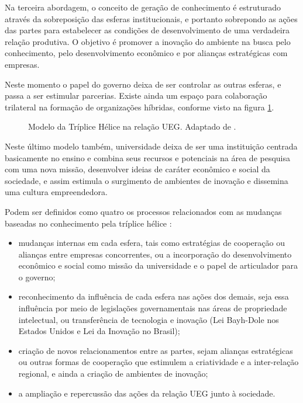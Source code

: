 Na terceira abordagem, o conceito de geração de conhecimento é estruturado através da sobreposição das esferas institucionais, e portanto sobrepondo as ações das partes para estabelecer as condições de desenvolvimento de uma verdadeira relação produtiva. O objetivo é promover a inovação do ambiente na busca pelo conhecimento, pelo desenvolvimento econômico e por alianças estratégicas com empresas.

Neste momento o papel do governo deixa de ser controlar as outras esferas, e passa a ser estimular parcerias. Existe ainda um espaço para colaboração trilateral na formação de organizações híbridas, conforme visto na figura \ref{triplice_helice}.


\begin{figure}[ht]
  \centering
  \caption{Modelo da Tríplice Hélice na relação UEG. Adaptado de \cite{etzkowitz2003innovation}.}
  \label{triplice_helice}
\end{figure}

Neste último modelo também, universidade deixa de ser uma instituição centrada basicamente no ensino e combina seus recursos e potenciais na área de pesquisa com uma nova missão, desenvolver ideias de caráter econômico e social da sociedade, e assim estimula o surgimento de ambientes de inovação e dissemina uma cultura empreendedora.

Podem ser definidos como quatro os processos relacionados com as mudanças baseadas no conhecimento pela tríplice hélice \cite{etzkowitz2003innovation}:

\begin{itemize}
  \item{mudanças internas em cada esfera, tais como estratégias de cooperação ou alianças entre empresas concorrentes, ou a incorporação do desenvolvimento econômico e social como missão da universidade e o papel de articulador para o governo;}
  \item{reconhecimento da influência de cada esfera nas ações dos demais, seja essa influência por meio de legislações governamentais nas áreas de propriedade intelectual, ou transferência de tecnologia e inovação (Lei Bayh-Dole nos Estados Unidos e Lei da Inovação no Brasil);}
  \item{criação de novos relacionamentos entre as partes, sejam alianças estratégicas ou outras formas de cooperação que estimulem a criatividade e a inter-relação regional, e ainda a criação de ambientes de inovação;}
  \item{a ampliação e repercussão das ações da relação UEG junto à sociedade.}
\end{itemize}

